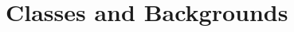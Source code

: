 \chapter{Classes and Backgrounds}

\begin{comment}

\section{Class And Level Bonuses}

\parhead{Base Save Bonus} The two numbers given in this column on
\tref{Base Save and Base Attack Bonuses} apply to saving throws. Whether a character uses the first (good) bonus or the second (poor) bonus depends on his or her class and the type of saving throw being attempted.
\begin{cp}%
For example, fighters
get the lower bonus on Reflex and Will saves and the higher bonus
on Fortitude saves, while rogues get the lower bonus on Fortitude
and Will saves and the higher bonus on Reflex saves. Monks are
equally good at all three types of saving throws. See each class's
description to find out which bonus applies to which category of
saves. If a character has more than one class, the base save
bonuses for each class are mostly cumulative; for more information, see
\pdref{Multiclass Characters}.
\end{cp}


\end{comment}
